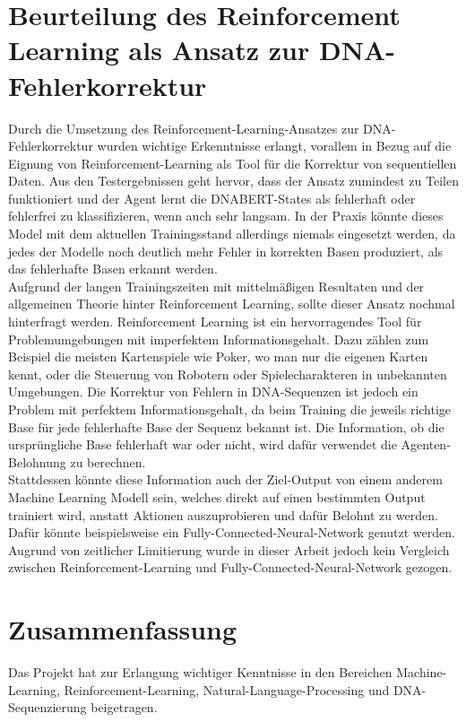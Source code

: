 \documentclass[oneside,bibliography=totocnumbered,BCOR=5mm]{scrbook}%
\theoremstyle{definition}
\theoremstyle{definition}
\theoremstyle{definition}
\theoremstyle{definition}
\theoremstyle{definition}
\theoremstyle{definition}
\begin{document}
\chapter{Beurteilung des Reinforcement Learning als Ansatz zur DNA-Fehlerkorrektur}
Durch die Umsetzung des Reinforcement-Learning-Ansatzes zur DNA-Fehlerkorrektur wurden wichtige Erkenntnisse erlangt,
vorallem in Bezug auf die Eignung von Reinforcement-Learning als Tool für die Korrektur von sequentiellen Daten.
Aus den Testergebnissen geht hervor, dass der Ansatz zumindest zu Teilen funktioniert und der
Agent lernt die DNABERT-States als fehlerhaft oder fehlerfrei zu klassifizieren, wenn auch sehr langsam.
In der Praxis könnte dieses Model mit dem aktuellen Trainingsstand allerdings niemals eingesetzt werden, 
da jedes der Modelle noch deutlich mehr Fehler in korrekten Basen produziert, als das fehlerhafte Basen erkannt werden. \\

Aufgrund der langen Trainingszeiten mit mittelmäßigen Resultaten und der allgemeinen Theorie hinter Reinforcement Learning,
sollte dieser Ansatz nochmal hinterfragt werden. 
Reinforcement Learning ist ein hervorragendes Tool für Problemumgebungen mit imperfektem Informationsgehalt.
Dazu zählen zum Beispiel die meisten Kartenspiele wie Poker, wo man nur die eigenen Karten kennt, oder die 
Steuerung von Robotern oder Spielecharakteren in unbekannten Umgebungen.
Die Korrektur von Fehlern in DNA-Sequenzen ist jedoch ein Problem mit perfektem Informationsgehalt, da beim Training
die jeweils richtige Base für jede fehlerhafte Base der Sequenz bekannt ist.
Die Information, ob die ursprüngliche Base fehlerhaft war oder nicht, wird dafür verwendet die Agenten-Belohnung 
zu berechnen. \\

Stattdessen könnte diese Information auch der Ziel-Output von einem anderem Machine Learning Modell sein, welches direkt
auf einen bestimmten Output trainiert wird, anstatt Aktionen auszuprobieren und dafür Belohnt zu werden. 
Dafür könnte beispielsweise ein Fully-Connected-Neural-Network genutzt werden. 
Augrund von zeitlicher Limitierung wurde in dieser Arbeit jedoch kein Vergleich zwischen
Reinforcement-Learning und Fully-Connected-Neural-Network gezogen.

\chapter{Zusammenfassung}
Das Projekt hat zur Erlangung wichtiger Kenntnisse in den Bereichen Machine-Learning, 
Reinforcement-Learning, Natural-Language-Processing und DNA-Sequenzierung beigetragen. \\
\end{document}

